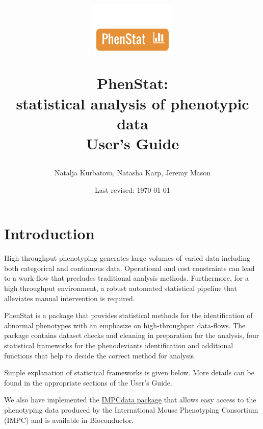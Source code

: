\documentclass[12pt,a4paper]{article}
\title{\begin{figure}[H]%
\centerline{\includegraphics[]{PhenStat_logo.png}}
\end{figure}\textbf{PhenStat}: \\ statistical analysis of phenotypic data\\ \textbf{User's Guide}}
\author{Natalja Kurbatova, Natasha Karp, Jeremy Mason}
\date{Last revised: \today}
\begin{document}
\maketitle
\newpage
\tableofcontents
\newpage
\section{Introduction}
High-throughput phenotyping generates large volumes of varied data including both categorical and continuous data. Operational and cost constraints can lead to a work-flow that precludes traditional analysis methods. Furthermore, for a high throughput environment, a robust automated statistical pipeline that alleviates manual intervention is required. 

PhenStat is a package that provides statistical methods for the identification of abnormal phenotypes with an emphasize on high-throughput data-flows. The package contains dataset checks and cleaning in preparation for the analysis, four statistical frameworks for the phenodeviants identification and additional functions that help to decide the correct method for analysis. 

Simple explanation of statistical frameworks is given below. More details can be found in the appropriate sections of the User's Guide. 

We also have implemented the \href{http://www.bioconductor.org/packages/bioc/html/IMPCdata.html}{IMPCdata package}  that allows easy access to the phenotyping data produced by the International Mouse Phenotyping Consortium (IMPC) and is available in Bioconductor.
\end{document}
